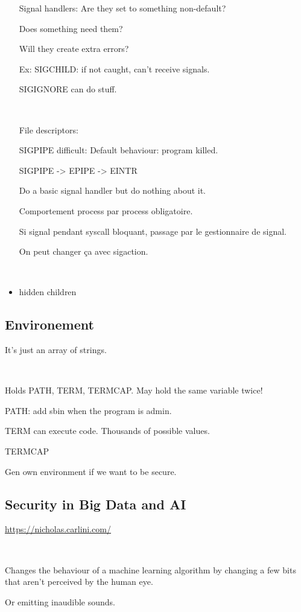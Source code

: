 \documentclass[a4paper,11pt]{article}
\begin{document}
\begin{itemize}
  Signal handlers: Are they set to something non-default?

  Does something need them?

  Will they create extra errors?

  Ex: SIGCHILD: if not caught, can't receive signals.

  SIGIGNORE can do stuff.

  \

  File descriptors:

  SIGPIPE difficult: Default behaviour: program killed.

  SIGPIPE -> EPIPE -> EINTR

  Do a basic signal handler but do nothing about it.

  Comportement process par process obligatoire.

  Si signal pendant syscall bloquant, passage par le gestionnaire de signal.

  On peut changer ça avec sigaction.

  \

\item hidden children
\end{itemize}

\subsection{Environement}

It's just an array of strings.

\

Holds PATH, TERM, TERMCAP. May hold the same variable twice!

PATH: add sbin when the program is admin.

TERM can execute code. Thousands of possible values.

TERMCAP

Gen own environment if we want to be secure.

\subsection{Security in Big Data and AI}

\url{https://nicholas.carlini.com/}

\

Changes the behaviour of a machine learning algorithm by changing a few bits
that aren't perceived by the human eye.

Or emitting inaudible sounds.
\end{document}
